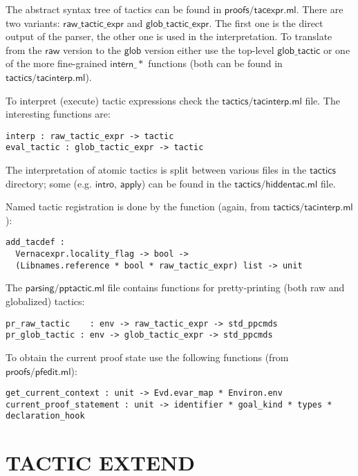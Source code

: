 \documentclass[a4paper,oneside]{book}
\newcommand{\m}[1]{\ensuremath{\mathsf{#1}}}
\begin{document}
The abstract syntax tree of tactics can be found in
\m{proofs/tacexpr.ml}. There are two variants: \m{raw\_tactic\_expr}
and \m{glob\_tactic\_expr}. The first one is the direct output of the
parser, the other one is used in the interpretation. To translate from
the \m{raw} version to the \m{glob} version either use the top-level
\m{glob\_tactic} or one of the more fine-grained \m{intern\_*} functions
(both can be found in \m{tactics/tacinterp.ml}).

To interpret (execute) tactic expressions check the
\m{tactics/tacinterp.ml} file. The interesting functions are:
\begin{lstlisting}
interp : raw_tactic_expr -> tactic
eval_tactic : glob_tactic_expr -> tactic
\end{lstlisting}
The interpretation of atomic tactics is split between various files in
the \m{tactics} directory; some (e.g. \m{intro}, \m{apply}) can be
found in the \m{tactics/hiddentac.ml} file.

Named tactic registration is done by the function (again, from
\m{tactics/tacinterp.ml}):
\begin{lstlisting}
add_tacdef :
  Vernacexpr.locality_flag -> bool ->
  (Libnames.reference * bool * raw_tactic_expr) list -> unit
\end{lstlisting}

The \m{parsing/pptactic.ml} file contains functions for
pretty-printing (both raw and globalized) tactics:

\begin{lstlisting}
pr_raw_tactic    : env -> raw_tactic_expr -> std_ppcmds
pr_glob_tactic : env -> glob_tactic_expr -> std_ppcmds
\end{lstlisting}

To obtain the current proof state use the following functions
(from \m{proofs/pfedit.ml}):
\begin{lstlisting}
get_current_context : unit -> Evd.evar_map * Environ.env
current_proof_statement : unit -> identifier * goal_kind * types * declaration_hook

\end{lstlisting}



\newpage

\section{TACTIC EXTEND}
\end{document}
